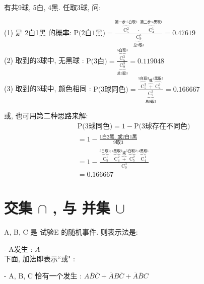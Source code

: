 \documentclass[UTF8]{ctexart}
\begin{document}
	
	
	\begin{myEnvSample}
		有共9球, 5白, 4黑. 任取3球, 问:
		
		(1) 是 2白1黑 的概率: 		
		$
		\text{P(2白1黑)}=\frac{\overset{\text{第一步:5白取}2}{\overbrace{\text{C}_{5}^{2}}}\cdot \overset{\text{第二步:4黑取}1}{\overbrace{\text{C}_{4}^{1}}}}{\underset{\text{总9取}3}{\underbrace{\text{C}_{9}^{3}}}}=0.47619
		$ \\
		
		(2) 取到的3球中, 无黑球 :		
		$
		\text{P(3白)}=\frac{\overset{5\text{白取}3}{\overbrace{\text{C}_{5}^{3}}}}{\underset{\text{总9取}3}{\underbrace{\text{C}_{9}^{3}}}}=0.119048
		$ \\
		
		(3) 取到的3球中, 颜色相同 : 		
		$
		\text{P(3球同色)}=\frac{\overset{5\text{白取}3}{\overbrace{\text{C}_{5}^{3}}}\overset{\text{或}}{\overbrace{+}}\overset{4\text{黑取}3}{\overbrace{\text{C}_{4}^{3}}}}{\underset{\text{总9取}3}{\underbrace{\text{C}_{9}^{3}}}}=0.166667
		$
		
		或, 也可用第二种思路来解:  		
		\begin{align*}  %
	&\text{P(3球同色)}=1-\text{P(3球存在不同色)}\\
&=1-\frac{1\text{白2黑,\ 或2白1黑}}{9\text{取}3}\\
&=1-\frac{\overset{5\text{白取}1; }{\overbrace{\text{C}_{5}^{1}}}\overset{4\text{黑取}2}{\overbrace{\text{C}_{4}^{2}}}\overset{\text{或}}{\overbrace{+}}\overset{5\text{白取}2; }{\overbrace{\text{C}_{5}^{2}}}\overset{4\text{黑取}1}{\overbrace{\text{C}_{4}^{1}}}}{\text{C}_{9}^{3}}\\
&=0.166667
		\end{align*}

	\end{myEnvSample}
	
	
	

	
	\section{交集 $\cap$ , 与 并集 $\cup$}
	
	A, B, C 是 试验E 的随机事件. 则表示法是:
	
	- A发生 : $A$ \\
	
	下面, 加法即表示``或" :
	
	- A, B, C 恰有一个发生 : $A\overline{B}\overline{C}+\overline{A}B\overline{C}+\overline{A}\overline{B}C$
	
\end{document}
